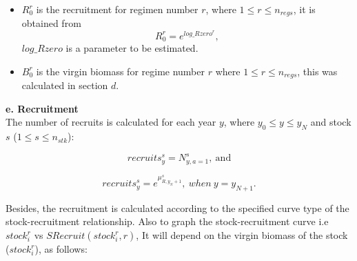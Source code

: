 \documentclass{article}
\begin{document}
\begin{itemize}

\item $R^{r}_0$ is the recruitment for regimen number $r$, where $1\leq r \leq n_{regs}$, it is obtained from 
\begin{equation}
    R^r_0=e^{log\_Rzero^r},
\end{equation}
$log\_Rzero$ is a parameter to be estimated.

\item $B^{r}_0$ is the virgin biomass for regime number $r$ where $1\leq r \leq n_{regs}$, this was calculated in section $d$.


\end{itemize}

\hfill

\textbf{e. Recruitment}\\


The number of recruits is calculated for each year $y$, where $y_0\leq y \leq y_N$ and stock $s$ ($1\leq s \leq n_{stk}$):

\begin{equation}
    recruits^s_y =N^s_{y,a = 1}, \ \text{and}
\end{equation}


\begin{equation}
    recruits^s_{y}=e^{\mu^s_{R,y_N+1}}, \ when \ y = y_{N+1}.
\end{equation}

Besides, the recruitment is calculated according to the specified curve type of the stock-recruitment relationship. Also to graph the stock-recruitment curve i.e $stock^r_i$ vs $SRecruit(stock^r_i, r)$, It will depend on the virgin biomass of the stock ($stock_i^r$), as follows:
\end{document}

